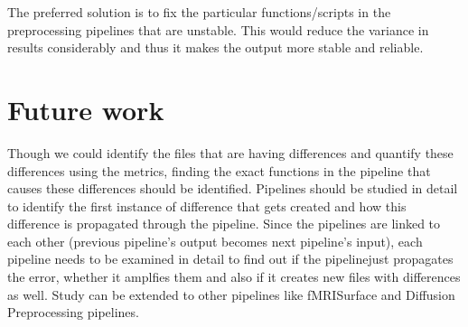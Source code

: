 The preferred solution is to fix the particular functions/scripts in the preprocessing pipelines that are unstable. This would reduce the variance in results considerably and thus it makes the output more stable and reliable.

\section{Future work}
Though we could identify the files that are having differences and quantify these differences using the metrics, finding the exact functions in the pipeline that causes these differences should be identified.
Pipelines should be studied in detail to identify the first instance of difference that gets created and how this difference is propagated through the pipeline.
Since the pipelines are linked to each other (previous pipeline's output becomes next pipeline's input), each pipeline needs to be examined in detail to find out if the pipelinejust propagates the error, whether it amplfies them and also if it creates new files with differences as well.
Study can be extended to other pipelines like fMRISurface and Diffusion Preprocessing pipelines.
